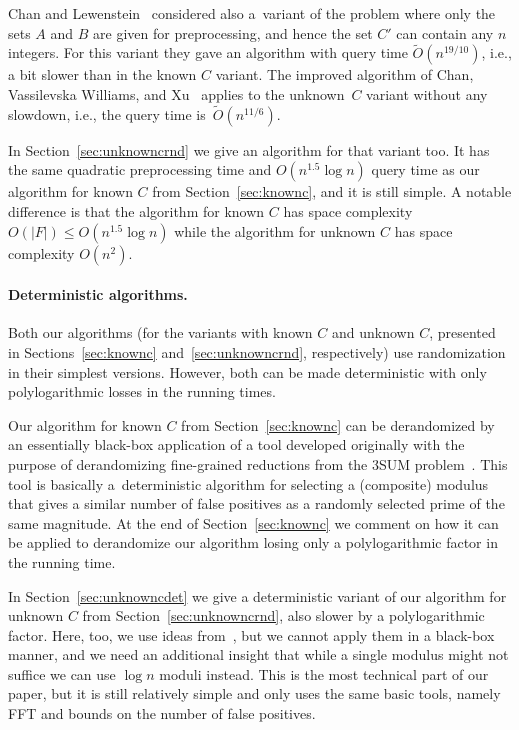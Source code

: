\documentclass[10pt,a4paper]{article}
\newcommand{\Ot}{\widetilde{O}}
\begin{document}
Chan and Lewenstein~\cite{ChanL15} considered also a~variant of the problem where only the sets $A$ and $B$ are given for preprocessing, and hence the set $C'$ can contain any $n$ integers. For this variant they gave an algorithm with query time $\Ot(n^{19/10})$, i.e., a bit slower than in the known $C$ variant.  The improved algorithm of Chan, Vassilevska Williams, and Xu~\cite{ChanWX23} applies to the unknown~$C$ variant without any slowdown, i.e., the query time is~$\Ot(n^{11/6})$.

In Section~\ref{sec:unknowncrnd} we give an algorithm for that variant too. It has the same quadratic preprocessing time and $O(n^{1.5} \log n)$ query time as our algorithm for known $C$ from Section~\ref{sec:knownc}, and it is still simple. A notable difference is that the algorithm for known $C$ has space complexity $O(|F|) \leqslant O(n^{1.5} \log n)$ while the algorithm for unknown $C$ has space complexity $O(n^2)$.

\paragraph{Deterministic algorithms.}
Both our algorithms (for the variants with known $C$ and unknown $C$, presented in Sections~\ref{sec:knownc} and~\ref{sec:unknowncrnd}, respectively) use randomization in their simplest versions. However, both can be made deterministic with only polylogarithmic losses in the running times.

Our algorithm for known $C$ from Section~\ref{sec:knownc} can be derandomized by an essentially black-box application of a tool developed originally with the purpose of derandomizing fine-grained reductions from the 3SUM problem~\cite{FischerK024}. This tool is basically a~deterministic algorithm for selecting a (composite) modulus that gives a similar number of false positives as a randomly selected prime of the same magnitude. At the end of Section~\ref{sec:knownc} we comment on how it can be applied to derandomize our algorithm losing only a polylogarithmic factor in the running time.


In Section~\ref{sec:unknowncdet} we give a deterministic variant of our algorithm for unknown $C$ from Section~\ref{sec:unknowncrnd}, also slower by a polylogarithmic factor. Here, too, we use ideas from~\cite{FischerK024}, but we cannot apply them in a black-box manner, and we need an additional insight that while a single modulus might not suffice we can use $\log n$ moduli instead. This is the most technical part of our paper, but it is still relatively simple and only uses the same basic tools, namely FFT and bounds on the number of false positives.
\end{document}
